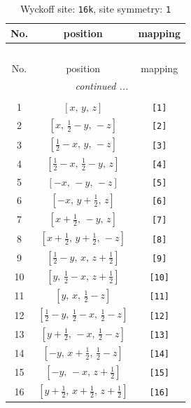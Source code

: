 \documentclass[fleqn,8pt]{jsarticle}
\begin{document}
\begin{longtable}{ccc}
\caption{Wyckoff site: {\tt 16k}, site symmetry: {\tt 1}}
 \\
 \hline \hline
No. & position & mapping \\ \hline \endfirsthead

\multicolumn{2}{l}{\tablename\ \thetable{}} \\
 \hline \hline
No. & position & mapping \\ \hline \endhead

 \hline \hline
\multicolumn{2}{r}{\footnotesize\it continued ...} \\ \endfoot

 \hline \hline
\multicolumn{2}{r}{} \\ \endlastfoot

1 & $\left[ x,\, y,\, z \right]$ & {\tt [1]} \\ \hline
2 & $\left[ x,\, \frac{1}{2} - y,\, - z \right]$ & {\tt [2]} \\ \hline
3 & $\left[ \frac{1}{2} - x,\, y,\, - z \right]$ & {\tt [3]} \\ \hline
4 & $\left[ \frac{1}{2} - x,\, \frac{1}{2} - y,\, z \right]$ & {\tt [4]} \\ \hline
5 & $\left[ - x,\, - y,\, - z \right]$ & {\tt [5]} \\ \hline
6 & $\left[ - x,\, y + \frac{1}{2},\, z \right]$ & {\tt [6]} \\ \hline
7 & $\left[ x + \frac{1}{2},\, - y,\, z \right]$ & {\tt [7]} \\ \hline
8 & $\left[ x + \frac{1}{2},\, y + \frac{1}{2},\, - z \right]$ & {\tt [8]} \\ \hline
9 & $\left[ \frac{1}{2} - y,\, x,\, z + \frac{1}{2} \right]$ & {\tt [9]} \\ \hline
10 & $\left[ y,\, \frac{1}{2} - x,\, z + \frac{1}{2} \right]$ & {\tt [10]} \\ \hline
11 & $\left[ y,\, x,\, \frac{1}{2} - z \right]$ & {\tt [11]} \\ \hline
12 & $\left[ \frac{1}{2} - y,\, \frac{1}{2} - x,\, \frac{1}{2} - z \right]$ & {\tt [12]} \\ \hline
13 & $\left[ y + \frac{1}{2},\, - x,\, \frac{1}{2} - z \right]$ & {\tt [13]} \\ \hline
14 & $\left[ - y,\, x + \frac{1}{2},\, \frac{1}{2} - z \right]$ & {\tt [14]} \\ \hline
15 & $\left[ - y,\, - x,\, z + \frac{1}{2} \right]$ & {\tt [15]} \\ \hline
16 & $\left[ y + \frac{1}{2},\, x + \frac{1}{2},\, z + \frac{1}{2} \right]$ & {\tt [16]} \\
\end{longtable}
\end{document}
